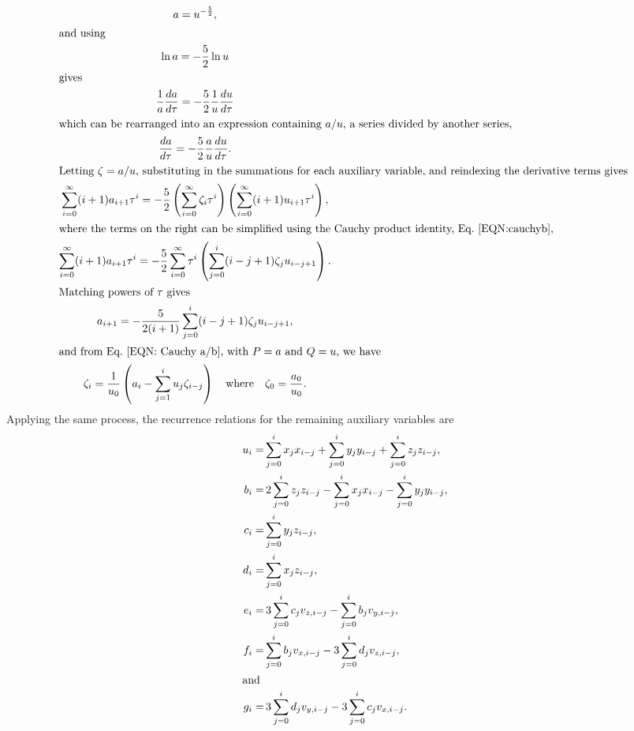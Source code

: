 \documentclass[draft]{agujournal2019}
\begin{document}
        \begin{gather*}
            	    a=u^{-\frac{5}{2}},\\
            \intertext{and using}
            	\ln a=-\frac{5}{2}\ln u\\
             \intertext{gives}
            	\frac{1}{a}\frac{da}{d\tau}=-\frac{5}{2}\frac{1}{u}\frac{du}{d\tau}\\
            \intertext{which can be rearranged into an expression containing $a/u$, a series divided by another series,}
            		\frac{da}{d\tau}=-\frac{5}{2}\frac{a}{u}\frac{du}{d\tau}.\\
            \intertext{Letting $\zeta=a/u$, substituting in the summations for each auxiliary variable, and reindexing the derivative terms gives }
            		\sum_{i=0}^\infty (i+1)a_{i+1}\tau^i=-\frac{5}{2}\left( \sum_{i=0}^\infty\zeta_i\tau^i \right)\left( \sum_{i=0}^\infty (i+1)u_{i+1}\tau^i \right), \\
            \intertext{where the terms on the right can be simplified using the Cauchy product identity, Eq.~\eqref{EQN:cauchyb},}
                    	\sum_{i=0}^\infty (i+1)a_{i+1}\tau^i=-\frac{5}{2}\sum_{i=0}^\infty \tau^i\left(\sum_{j=0}^i(i-j+1)\zeta_j u_{i-j+1}\right).\\
            \intertext{Matching powers of $\tau$ gives}
                    a_{i+1}=-\frac{5}{2(i+1)}\sum_{j=0}^i(i-j+1)\zeta_j u_{i-j+1},\\
            \intertext{and from Eq.~\eqref{EQN: Cauchy a/b}, with $P=a$ and $Q=u$, we have}
                \zeta_i=\frac{1}{u_0}\left(a_i-\sum_{j=1}^iu_j\zeta_{i-j}\right)\quad\mbox{where}\quad \zeta_0=\frac{a_0}{u_0}.
        \end{gather*}
Applying the same process, the recurrence relations for the remaining auxiliary variables are
        \begin{align*}
            u_i=&\sum_{j=0}^i x_jx_{i-j}+\sum_{j=0}^i y_jy_{i-j}+\sum_{j=0}^i z_jz_{i-j},\\
            b_i=&\,2\sum_{j=0}^i z_jz_{i-j}-\sum_{j=0}^i x_jx_{i-j}-\sum_{j=0}^i y_jy_{i-j},\\
            c_i=&\sum_{j=0}^i y_jz_{i-j},\\
            d_i=&\sum_{j=0}^i x_jz_{i-j},\\
            e_i=&\,3\sum_{j=0}^i c_jv_{z,i-j}-\sum_{j=0}^i b_jv_{y,i-j},\\
            f_i=&\sum_{j=0}^i b_jv_{x,i-j}-3\sum_{j=0}^i d_jv_{z,i-j},\\
    \intertext{and}
            g_i=&\,3\sum_{j=0}^i d_jv_{y,i-j}-3\sum_{j=0}^i c_jv_{x,i-j}.
        \end{align*}
\end{document}
